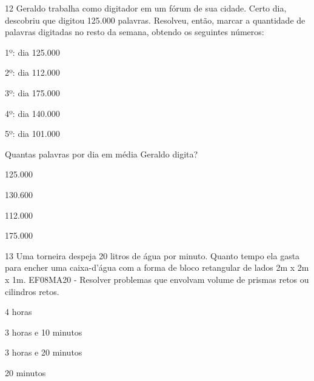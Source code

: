 





\num{12} Geraldo trabalha como digitador em um fórum de sua cidade. Certo
dia, descobriu que digitou 125.000 palavras. Resolveu, então, marcar a
quantidade de palavras digitadas no resto da semana, obtendo os
seguintes números:

1º: dia 125.000

2º: dia 112.000

3º: dia 175.000

4º: dia 140.000

5º: dia 101.000

Quantas palavras por dia em média Geraldo digita?
\item 125.000
\item 130.600
\item 112.000
\item 175.000








\num{13} Uma torneira despeja 20 litros de água por minuto. Quanto tempo ela
gasta para encher uma caixa-d'água com a forma de bloco retangular de
lados 2m x 2m x 1m. EF08MA20 - Resolver problemas que envolvam volume de
prismas retos ou cilindros retos.
\item 4 horas
\item 3 horas e 10 minutos
\item 3 horas e 20 minutos
\item 20 minutos

